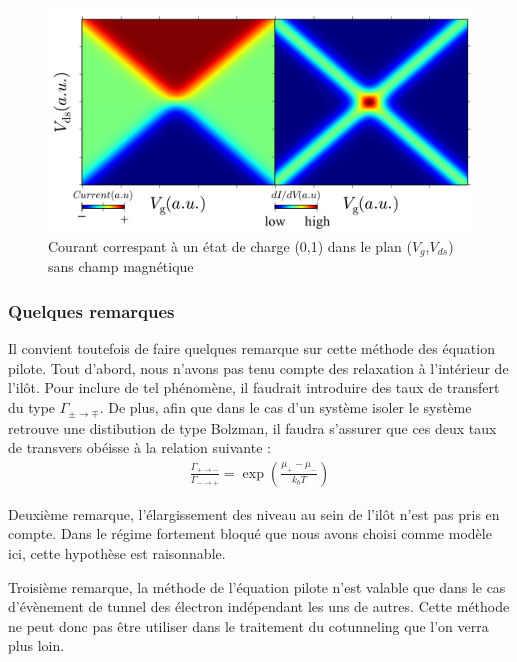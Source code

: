 \begin{figure}
\begin{center}
\includegraphics[scale=0.5]{Annexes/figure1/figure4.pdf} 
\caption{Courant correspant à un état de charge (0,1) dans le plan ($V_g$,$V_{ds}$) sans champ magnétique}
\label{SimulatedCoulombMap}
\end{center}
\end{figure}

\subsubsection{Quelques remarques}
Il convient toutefois de faire quelques remarque sur cette méthode des équation pilote. Tout d'abord, nous n'avons pas tenu compte des relaxation à l'intérieur de l'il\^ot. Pour inclure de tel phénomène, il faudrait introduire des taux de transfert du type $\Gamma_{\pm \rightarrow \mp}$. De plus, afin que dans le cas d'un système isoler le système retrouve une distibution de type Bolzman, il faudra s'assurer que ces deux taux de transvers obéisse à la relation suivante :
\begin{eqnarray}
\frac{\Gamma_{+ \rightarrow -}}{\Gamma_{- \rightarrow +}} = \exp(\frac{\mu_{+}- \mu_{-}}{k_bT}) \nonumber
\end{eqnarray}

Deuxième remarque, l'élargissement des niveau au sein de l'il\^ot n'est pas pris en compte. Dans le régime fortement bloqué que nous avons choisi comme modèle ici, cette hypothèse est raisonnable. 

Troisième remarque, la méthode de l'équation pilote n'est valable que dans le cas d'évènement de tunnel des électron indépendant les uns de autres. Cette méthode ne peut donc pas \^etre utiliser dans le traitement du cotunneling que l'on verra plus loin.
